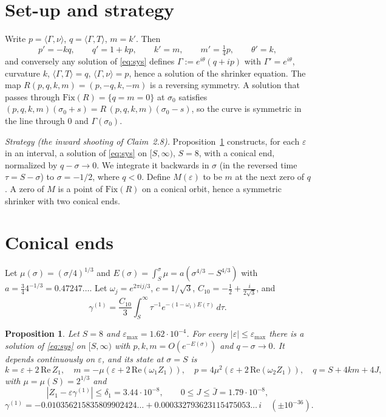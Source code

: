 \documentclass[11pt]{amsart}
\newtheorem{proposition}[theorem]{Proposition}
\theoremstyle{remark}
\newcommand{\eps}{\varepsilon}
\newcommand{\ip}[2]{\langle #1,#2\rangle}
\begin{document}
\section{Set-up and strategy}
Write $p=\ip{\Gamma}{\nu}$, $q=\ip{\Gamma}{T}$, $m=k'$. Then
\begin{equation}\label{eq:sys}
p'=-kq,\qquad q'=1+kp,\qquad k'=m,\qquad m'=\tfrac14 p,\qquad \theta'=k,
\end{equation}
and conversely any solution of \eqref{eq:sys} defines $\Gamma:=e^{i\theta}(q+ip)$ with $\Gamma'=e^{i\theta}$, curvature $k$, $\ip{\Gamma}{T}=q$, $\ip{\Gamma}{\nu}=p$, hence a solution of the shrinker equation. The map $R(p,q,k,m)=(p,-q,k,-m)$ is a reversing symmetry. A solution that passes through $\mathrm{Fix}(R)=\{q=m=0\}$ at $\sigma_0$ satisfies $(p,q,k,m)(\sigma_0+s)=R\,(p,q,k,m)(\sigma_0-s)$, so the curve is symmetric in the line through $0$ and $\Gamma(\sigma_0)$.

\emph{Strategy (the inward shooting of Claim~2.8).} Proposition~\ref{prop:tail} constructs, for each $\eps$ in an interval, a solution of \eqref{eq:sys} on $[S,\infty)$, $S=8$, with a conical end, normalized by $q-\sigma\to0$. We integrate it backwards in $\sigma$ (in the reversed time $\tau=S-\sigma$) to $\sigma=-1/2$, where $q<0$. Define $M(\eps)$ to be $m$ at the next zero of $q$. A zero of $M$ is a point of $\mathrm{Fix}(R)$ on a conical orbit, hence a symmetric shrinker with two conical ends.

\section{Conical ends}\label{sec:tail}
Let $\mu(\sigma)=(\sigma/4)^{1/3}$ and $E(\sigma)=\int_S^\sigma\mu=a(\sigma^{4/3}-S^{4/3})$ with $a=\frac34 4^{-1/3}=0.47247\ldots$. Let $\omega_j=e^{2\pi i j/3}$, $c=1/\sqrt3$, $C_{10}=-\frac12+\frac{i}{2\sqrt3}$, and
\[
\gamma^{(1)}=\frac{C_{10}}3\int_S^\infty \tau^{-1}e^{-(1-\omega_1)E(\tau)}\,d\tau .
\]

\begin{proposition}\label{prop:tail}
Let $S=8$ and $\eps_{\max}=1.62\cdot10^{-4}$. For every $|\eps|\le\eps_{\max}$ there is a solution of \eqref{eq:sys} on $[S,\infty)$ with $p,k,m=O(e^{-E(\sigma)})$ and $q-\sigma\to0$. It depends continuously on $\eps$, and its state at $\sigma=S$ is
\[
k=\eps+2\,\mathrm{Re}\,Z_1,\quad m=-\mu(\eps+2\,\mathrm{Re}(\omega_1Z_1)),\quad p=4\mu^2(\eps+2\,\mathrm{Re}(\omega_2Z_1)),\quad q=S+4km+4J,
\]
with $\mu=\mu(S)=2^{1/3}$ and
\[
|Z_1-\eps\gamma^{(1)}|\le\delta_1=3.44\cdot10^{-8},\qquad 0\le J\le \bar J=1.79\cdot10^{-8},
\]
\[
\gamma^{(1)}=-0.010356215835809902424\ldots+0.000332793623115475053\ldots\,i\quad(\pm 10^{-36}).
\]
\end{proposition}
\end{document}
